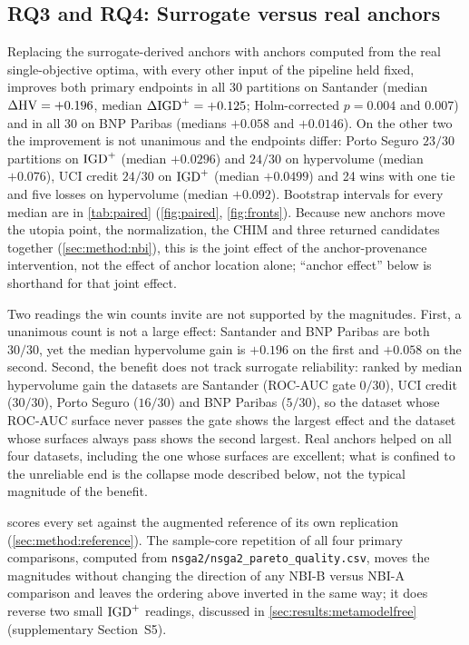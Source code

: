 \subsection{RQ3 and RQ4: Surrogate versus real anchors}
\label{sec:results:anchors}



Replacing the surrogate-derived anchors with anchors computed from the real single-objective optima, with every
other input of the pipeline held fixed, improves both primary endpoints in all 30 partitions on Santander (median $\Delta\mathrm{HV} = +0.196$, median
$\Delta\mathrm{IGD}^{+} = +0.125$; Holm-corrected $p = 0.004$ and $0.007$) and in all 30 on BNP Paribas (medians $+0.058$ and
$+0.0146$). On the other two the improvement is not unanimous and the endpoints differ: Porto Seguro $23/30$
partitions on $\mathrm{IGD}^{+}$ (median $+0.0296$) and $24/30$ on hypervolume (median $+0.076$), UCI credit $24/30$ on $\mathrm{IGD}^{+}$
(median $+0.0499$) and 24 wins with one tie and five losses on hypervolume (median $+0.092$). Bootstrap intervals for
every median are in \cref{tab:paired} (\cref{fig:paired}, \cref{fig:fronts}). Because new anchors move the utopia
point, the normalization, the CHIM and three returned candidates together (\cref{sec:method:nbi}), this is the joint
effect of the anchor-provenance intervention, not the effect of anchor location alone; ``anchor effect'' below is
shorthand for that joint effect.

Two readings the win counts invite are not supported by the magnitudes. First, a unanimous count is not a large
effect: Santander and BNP Paribas are both $30/30$, yet the median hypervolume gain is $+0.196$ on the first and
$+0.058$ on the second. Second, the benefit does not track surrogate reliability: ranked by median hypervolume gain
the datasets are Santander (ROC-AUC gate $0/30$), UCI credit ($30/30$), Porto Seguro ($16/30$) and BNP Paribas
($5/30$), so the dataset whose ROC-AUC surface never passes the gate shows the largest effect and the dataset whose
surfaces always pass shows the second largest. Real anchors helped on all four datasets, including the one whose
surfaces are excellent; what is confined to the unreliable end is the collapse mode described below, not the typical
magnitude of the benefit.

 scores every set against the augmented reference of its own replication
(\cref{sec:method:reference}). The sample-core repetition of all four primary comparisons, computed from
\texttt{nsga2/\allowbreak nsga2\_\allowbreak pareto\_\allowbreak quality.csv}, moves the magnitudes without changing
the direction of any NBI-B versus NBI-A comparison and leaves the ordering above inverted in the same way; it does
reverse two small $\mathrm{IGD}^{+}$ readings, discussed in \cref{sec:results:metamodelfree} (supplementary Section~S5).

